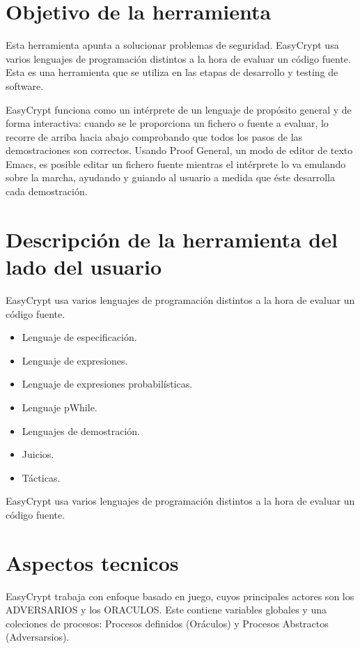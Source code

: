 \documentclass[runningheads,a4paper]{llncs}
\begin{document}
\section{Objetivo de la herramienta} 

Esta herramienta apunta a solucionar problemas de seguridad. EasyCrypt usa varios lenguajes de programación distintos a la hora de evaluar un código fuente. Esta es una herramienta que se utiliza en las etapas de desarrollo y testing de software. 

EasyCrypt funciona como un intérprete de un lenguaje de propósito general y de forma interactiva: cuando se le proporciona un fichero o fuente a evaluar, lo recorre de arriba hacia abajo comprobando que todos los pasos de las demostraciones son correctos. Usando Proof General, un modo de editor de texto Emacs, es posible editar un fichero fuente mientras el intérprete lo va emulando sobre la marcha, ayudando y guiando al usuario a medida que éste desarrolla cada demostración. 

\section{Descripción de la herramienta del lado del usuario}

EasyCrypt usa varios lenguajes de programación distintos a la hora de evaluar un código fuente. 

\begin{itemize}
	\item Lenguaje de especificación.
	\item Lenguaje de expresiones.
	\item Lenguaje de expresiones probabilísticas.
	\item Lenguaje pWhile.
	\item Lenguajes de demostración.
	\item Juicios.
	\item Tácticas.
\end{itemize}

EasyCrypt usa varios lenguajes de programación distintos a la hora de evaluar un código fuente. 

\section{Aspectos tecnicos}
EasyCrypt trabaja con enfoque basado en juego, cuyos principales actores son los ADVERSARIOS y los ORACULOS. Este contiene variables globales y una coleciones de procesos: Procesos definidos (Oráculos) y Procesos Abstractos (Adversarsios).
\end{document}
